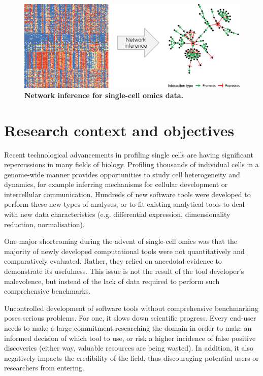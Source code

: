 \begin{figure}[htb!]
	\centering
	\includegraphics[width=.6\linewidth]{fig/comptools2/comptool_5_networkinference.pdf}
	\caption{
		\textbf{Network inference for single-cell omics data.}
	}
	\label{fig:comp_tools_ni}
\end{figure}



\section{Research context and objectives} \label{sec:research_objectives}
Recent technological advancements in profiling single cells are having significant repercussions in many fields of biology. Profiling thousands of individual cells in a genome-wide manner provides opportunities to study cell heterogeneity and dynamics, for example inferring mechanisms for cellular development or intercellular communication. 
Hundreds of new software tools were developed \cite{zappia_exploringsinglecellrnaseq_2018} to perform these new types of analyses, or to fit existing analytical tools to deal with new data characteristics (e.g. differential expression, dimensionality reduction, normalisation). 

One major shortcoming during the advent of single-cell omics was that the majority of newly developed computational tools were not quantitatively and comparatively evaluated. Rather, they relied on anecdotal evidence to demonstrate its usefulness. This issue is not the result of the tool developer's malevolence, but instead of the lack of data required to perform such comprehensive benchmarks.

Uncontrolled development of software tools without comprehensive benchmarking poses serious problems. 
For one, it slows down scientific progress. Every end-user needs to make a large commitment researching the domain in order to make an informed decision of which tool to use, or risk a higher incidence of false positive discoveries (either way, valuable resources are being wasted). In addition, it also negatively impacts the credibility of the field, thus discouraging potential users or researchers from entering.

